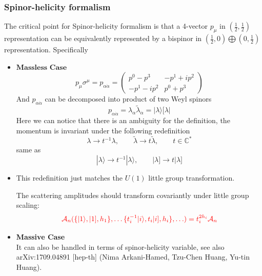 \documentclass{beamer}
\newcommand{\aket}[1]{|#1\rangle}
\newcommand{\sket}[1]{|#1]}
\begin{document}
\begin{frame}
\frametitle{Spinor-helicity formalism}
    The critical point for Spinor-helicity formalism is that a 4-vector $p_\mu$ in $(\frac{1}{2},\frac{1}{2})$ representation can be equivalently represented by a bispinor in $(\frac{1}{2},0)\bigoplus (0,\frac{1}{2})$ representation.
    Specifically
    \begin{itemize}
        \item $\bm{\text{Massless Case}}$\\
    \begin{equation*}
        p_\mu \sigma^\mu=p_{\alpha\dot{\alpha}}=\begin{pmatrix*} 
            p^0-p^3 & -p^1+ip^2\\
            -p^1-ip^2 & p^0+p^3
        \end{pmatrix*}
    \end{equation*}
    And $p_{\alpha\dot{\alpha}}$ can be decomposed into product of two Weyl spinors
    \begin{equation*}
        p_{\alpha\dot{\alpha}}=\lambda_\alpha \tilde{\lambda}_{\dot{\alpha}}=\aket{\lambda}[\lambda|
    \end{equation*}
    Here we can notice that there is an ambiguity for the definition, the momentum is invariant under the following redefinition
    \begin{equation*}
        \lambda \rightarrow t^{-1}\lambda, \qquad \tilde{\lambda}\rightarrow t\tilde{\lambda}, \qquad t\in\mathbb{C^*} 
    \end{equation*}
    same as 
    \begin{equation*}
        \aket{\lambda}\rightarrow t^{-1}\aket{\lambda}, \qquad \sket{\lambda}\rightarrow t\sket{\lambda}
    \end{equation*}
    \end{itemize}
\end{frame}

\begin{frame}
    \begin{itemize}
        \item[]  This redefinition just matches the $U(1)$ little group transformation.
        \vspace{0.5em}
        
        The scattering amplitudes should transform covariantly under little group scaling:
        \begin{equation*}
            \color{red} \mathcal{A}_n(\{\aket{1},\sket{1},h_1\},\ldots\{t_i^{-1}\aket{i},t_i\sket{i},h_i\},\ldots )=t_i^{2h_i}\mathcal{A}_n
        \end{equation*}
        \item \textbf{Massive Case}\\
        It can also be handled in terms of spinor-helicity variable, see also 	arXiv:1709.04891 [hep-th] (Nima Arkani-Hamed, Tzu-Chen Huang, Yu-tin Huang).
    \end{itemize}
\end{frame}
\end{document}
